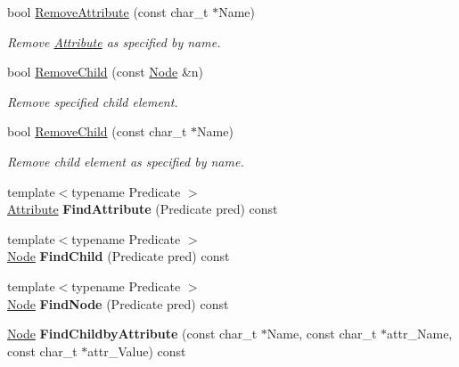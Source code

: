 \begin{DoxyCompactItemize}
bool \hyperlink{classphys_1_1xml_1_1Node_ab166876c5dd5a43a16eb0a4c110be7ca}{RemoveAttribute} (const char\_\-t $\ast$Name)
\begin{DoxyCompactList}\small\item\em Remove \hyperlink{classphys_1_1xml_1_1Attribute}{Attribute} as specified by name. \item\end{DoxyCompactList}\item 
bool \hyperlink{classphys_1_1xml_1_1Node_a946bb656b94c9d3a561200cd2cd3ee11}{RemoveChild} (const \hyperlink{classphys_1_1xml_1_1Node}{Node} \&n)
\begin{DoxyCompactList}\small\item\em Remove specified child element. \item\end{DoxyCompactList}\item 
bool \hyperlink{classphys_1_1xml_1_1Node_a2612e301caa54ac6af135b8fb11b2e25}{RemoveChild} (const char\_\-t $\ast$Name)
\begin{DoxyCompactList}\small\item\em Remove child element as specified by name. \item\end{DoxyCompactList}\item 
\hypertarget{classphys_1_1xml_1_1Node_ab1ad6ee2e78ddd3f591faffe675ed910}{
{\footnotesize template$<$typename Predicate $>$ }\\\hyperlink{classphys_1_1xml_1_1Attribute}{Attribute} {\bfseries FindAttribute} (Predicate pred) const }
\label{d7/d0a/classphys_1_1xml_1_1Node_ab1ad6ee2e78ddd3f591faffe675ed910}

\item 
\hypertarget{classphys_1_1xml_1_1Node_a1041d264f8927adb691c47ccacff28d4}{
{\footnotesize template$<$typename Predicate $>$ }\\\hyperlink{classphys_1_1xml_1_1Node}{Node} {\bfseries FindChild} (Predicate pred) const }
\label{d7/d0a/classphys_1_1xml_1_1Node_a1041d264f8927adb691c47ccacff28d4}

\item 
\hypertarget{classphys_1_1xml_1_1Node_ab2311cefdf1d7f4886cbebd7350d7731}{
{\footnotesize template$<$typename Predicate $>$ }\\\hyperlink{classphys_1_1xml_1_1Node}{Node} {\bfseries FindNode} (Predicate pred) const }
\label{d7/d0a/classphys_1_1xml_1_1Node_ab2311cefdf1d7f4886cbebd7350d7731}

\item 
\hypertarget{classphys_1_1xml_1_1Node_a647302cd585c40fcdc9570176947706d}{
\hyperlink{classphys_1_1xml_1_1Node}{Node} {\bfseries FindChildbyAttribute} (const char\_\-t $\ast$Name, const char\_\-t $\ast$attr\_\-Name, const char\_\-t $\ast$attr\_\-Value) const }
\label{d7/d0a/classphys_1_1xml_1_1Node_a647302cd585c40fcdc9570176947706d}


\end{DoxyCompactItemize}
